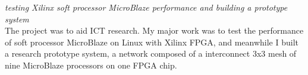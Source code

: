\documentclass[11pt,a4paper]{moderncv}
\begin{document}
{
    \smallskip
    \emph{testing Xilinx soft processor MicroBlaze performance and building a prototype system}
    \medskip  \\
    The project was to aid ICT research. My major work was to test the performance of soft processor MicroBlaze on Linux with Xilinx FPGA, and meanwhile I built a research prototype system, a network composed of a interconnect 3x3 mesh of nine MicroBlaze processors on one FPGA chip.\newline
}



\nocite{*}

%



\begin{comment}
	\begin{flushleft}
	\vspace{2cm}\hspace{3.5cm}
	Musterstadt, den \today
	\end{flushleft}


	\vspace{1cm} \hspace{3.5cm}
	Max Mustermann
\end{comment}
\end{document}
